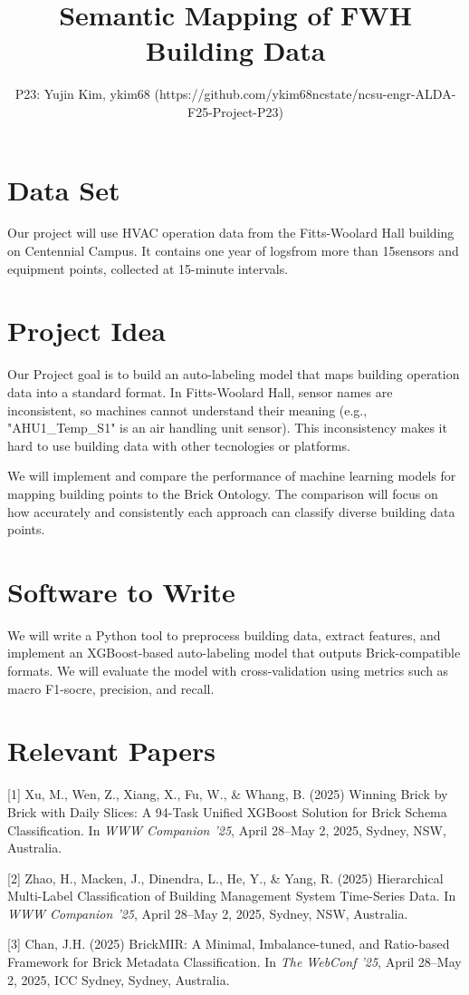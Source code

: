 \documentclass{article}
\title{Semantic Mapping of FWH Building Data}
\author{%
  P23: Yujin Kim, ykim68 (https://github.com/ykim68ncstate/ncsu-engr-ALDA-F25-Project-P23)\\
}
\begin{document}
\maketitle

\section{Data Set}

Our project will use HVAC operation data from the Fitts-Woolard Hall building on Centennial Campus. It contains one year of logsfrom more than 15sensors and equipment points, collected at 15-minute intervals.


\section{Project Idea}

Our Project goal is to build an auto-labeling model that maps building operation data into a standard format. In Fitts-Woolard Hall, sensor names are inconsistent, so machines cannot understand their meaning (e.g., "AHU1\_Temp\_{S1}" is an air handling unit sensor). This inconsistency makes it hard to use building data with other tecnologies or platforms.

We will implement and compare the performance of machine learning models for mapping building points to the Brick Ontology. The comparison will focus on how accurately and consistently each approach can classify diverse building data points.


\section{Software to Write}

We will write a Python tool to preprocess building data, extract features, and implement an XGBoost-based auto-labeling model that outputs Brick-compatible formats. We will evaluate the model with cross-validation using metrics such as macro F1-socre, precision, and recall.


\section{Relevant Papers}

\medskip

{
\small


[1] Xu, M., Wen, Z., Xiang, X., Fu, W., \& Whang, B. (2025) Winning Brick by Brick with Daily Slices: A 94-Task Unified XGBoost Solution for Brick Schema Classification. In {\it WWW Companion ’25}, April 28–May 2, 2025, Sydney, NSW, Australia.

[2] Zhao, H., Macken, J., Dinendra, L., He, Y., \& Yang, R. (2025) Hierarchical Multi-Label Classification of Building Management System Time-Series Data. In {\it WWW Companion ’25}, April 28–May 2, 2025, Sydney, NSW, Australia.

[3] Chan, J.H. (2025) BrickMIR: A Minimal, Imbalance-tuned, and Ratio-based Framework for Brick Metadata Classification. In {\it The WebConf ’25}, April 28–May 2, 2025, ICC Sydney, Sydney, Australia.
}
\end{document}
